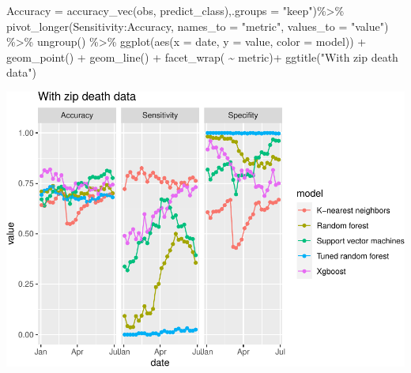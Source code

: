 \documentclass[
]{article}
\newenvironment{Shaded}{\begin{snugshade}}{\end{snugshade}}
\newcommand{\AttributeTok}[1]{\textcolor[rgb]{0.77,0.63,0.00}{#1}}
\newcommand{\FunctionTok}[1]{\textcolor[rgb]{0.00,0.00,0.00}{#1}}
\newcommand{\NormalTok}[1]{#1}
\newcommand{\SpecialCharTok}[1]{\textcolor[rgb]{0.00,0.00,0.00}{#1}}
\newcommand{\StringTok}[1]{\textcolor[rgb]{0.31,0.60,0.02}{#1}}
\begin{document}
\begin{Shaded}
\begin{Highlighting}[]
            \AttributeTok{Accuracy =} \FunctionTok{accuracy\_vec}\NormalTok{(obs, predict\_class),}\AttributeTok{.groups =} \StringTok{"keep"}\NormalTok{)}\SpecialCharTok{\%\textgreater{}\%}
  \FunctionTok{pivot\_longer}\NormalTok{(Sensitivity}\SpecialCharTok{:}\NormalTok{Accuracy, }\AttributeTok{names\_to =} \StringTok{"metric"}\NormalTok{, }\AttributeTok{values\_to =} \StringTok{"value"}\NormalTok{) }\SpecialCharTok{\%\textgreater{}\%}
  \FunctionTok{ungroup}\NormalTok{() }\SpecialCharTok{\%\textgreater{}\%}
  \FunctionTok{ggplot}\NormalTok{(}\FunctionTok{aes}\NormalTok{(}\AttributeTok{x =}\NormalTok{ date, }\AttributeTok{y =}\NormalTok{ value, }\AttributeTok{color =}\NormalTok{ model)) }\SpecialCharTok{+}
  \FunctionTok{geom\_point}\NormalTok{() }\SpecialCharTok{+}
  \FunctionTok{geom\_line}\NormalTok{() }\SpecialCharTok{+}
  \FunctionTok{facet\_wrap}\NormalTok{( }\SpecialCharTok{\textasciitilde{}}\NormalTok{ metric)}\SpecialCharTok{+}
  \FunctionTok{ggtitle}\NormalTok{(}\StringTok{"With zip death data"}\NormalTok{)}
\end{Highlighting}
\end{Shaded}

\includegraphics{figures/report/fig-unnamed-chunk-82-2.pdf}
\end{document}
